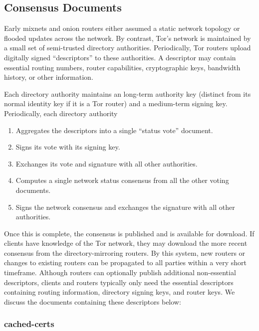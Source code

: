 \subsection{Consensus Documents}
\label{sec:ConsensusDocs}

Early mixnets and onion routers either assumed a static network topology or flooded updates across the network. By contrast, Tor's network is maintained by a small set of semi-trusted directory authorities. Periodically, Tor routers upload digitally signed ``descriptors'' to these authorities. A descriptor may contain essential routing numbers, router capabilities, cryptographic keys, bandwidth history, or other information.

Each directory authority maintains an long-term authority key (distinct from its normal identity key if it is a Tor router) and a medium-term signing key. Periodically, each directory authority 

\begin{enumerate}
	\item Aggregates the descriptors into a single ``status vote'' document.
	\item Signs its vote with its signing key.
	\item Exchanges its vote and signature with all other authorities.
	\item Computes a single network status consensus from all the other voting documents.
	\item Signs the network consensus and exchanges the signature with all other authorities.
\end{enumerate}

Once this is complete, the consensus is published and is available for download. If clients have knowledge of the Tor network, they may download the more recent consensus from the directory-mirroring routers. By this system, new routers or changes to existing routers can be propagated to all parties within a very short timeframe. Although routers can optionally publish additional non-essential descriptors, clients and routers typically only need the essential descriptors containing routing information, directory signing keys, and router keys. We discuss the documents containing these descriptors below\cite{TorCollector}\cite{TorDirSpec}:

\subsubsection{cached-certs}

